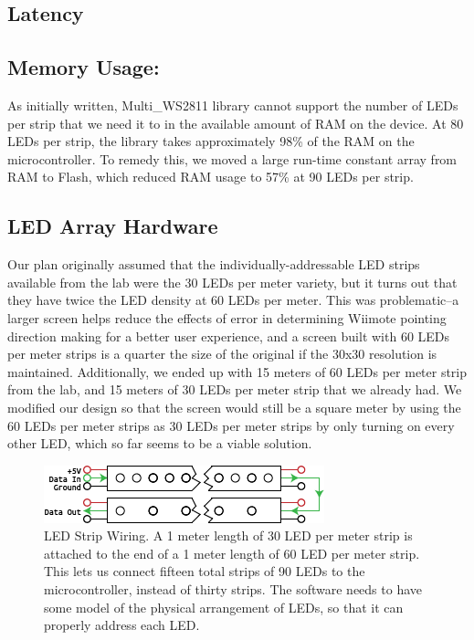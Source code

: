 \documentclass{tufte-handout}
\begin{document}
\subsection{Latency}
\subsection{Memory Usage:}
As initially written, Multi\_WS2811 library cannot support the number of LEDs per strip that we need it to in the available amount of RAM on the device. At 80 LEDs per strip, the library takes approximately 98\% of the RAM on the microcontroller. To remedy this, we moved a large run-time constant array from RAM to Flash, which reduced RAM usage to 57\% at 90 LEDs per strip.










\subsection{LED Array Hardware}
Our plan originally assumed that the individually-addressable LED strips
available from the lab were
the 30 LEDs per meter variety, but it turns out that they have twice the LED
density at 60 LEDs per meter. This was problematic--a larger screen helps
reduce the effects of error in determining Wiimote pointing direction making
for a better user experience, and a
screen built with 60 LEDs per meter strips is a quarter the size of the original
if the 30x30 resolution is maintained. 
Additionally, we ended up with 15
meters of 60 LEDs per meter strip from the lab, and 15 meters of 30 LEDs per
meter strip that we already had. 
We modified our design so that the screen
would still be a square meter by using the 60 LEDs per meter strips as 30 LEDs
per meter strips by only turning on every other LED, which so far seems to be
a viable solution.
\begin{figure}
    \includegraphics{Wiring_Diagram.png}
    \caption{LED Strip Wiring. A 1 meter length of 30 LED per meter strip is
    attached to the end of a 1 meter length of 60 LED per meter strip. This
lets us connect fifteen total strips of 90 LEDs to the microcontroller,
instead of thirty strips. The software needs to have some model of the
physical arrangement of LEDs, so that it can properly address each LED.}
\end{figure}
\end{document}
